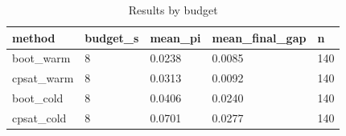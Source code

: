 \begin{table}[t]
\centering
\begin{tabular}{lllll}
\toprule
method & budget\_s & mean\_pi & mean\_final\_gap & n \\
\midrule
boot\_warm & 8 & 0.0238 & 0.0085 & 140 \\
cpsat\_warm & 8 & 0.0313 & 0.0092 & 140 \\
boot\_cold & 8 & 0.0406 & 0.0240 & 140 \\
cpsat\_cold & 8 & 0.0701 & 0.0277 & 140 \\
\bottomrule
\end{tabular}
\caption{Results by budget}
\label{tab:by-budget}
\end{table}
